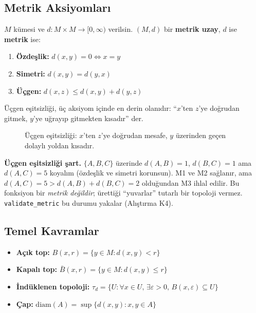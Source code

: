 \subsection{Metrik Aksiyomları}

\begin{definition}
$M$ kümesi ve $d: M \times M \to [0,\infty)$ verilsin.
$(M, d)$ bir \textbf{metrik uzay}, $d$ ise \textbf{metrik} ise:
\begin{enumerate}
  \item[(M1)] \textbf{Özdeşlik:} $d(x,y) = 0 \Leftrightarrow x = y$
  \item[(M2)] \textbf{Simetri:} $d(x,y) = d(y,x)$
  \item[(M3)] \textbf{Üçgen:} $d(x,z) \leq d(x,y) + d(y,z)$
\end{enumerate}
\end{definition}

Üçgen eşitsizliği, üç aksiyom içinde en derin olanıdır: ``$x$'ten $z$'ye doğrudan
gitmek, $y$'ye uğrayıp gitmekten kısadır'' der.

\begin{figure}[ht]
  \centering
  
  \caption{Üçgen eşitsizliği: $x$'ten $z$'ye doğrudan mesafe, $y$ üzerinden geçen
    dolaylı yoldan kısadır.}
\end{figure}

\begin{karsiornek}
\textbf{Üçgen eşitsizliği şart.} $\{A,B,C\}$ üzerinde $d(A,B)=1$, $d(B,C)=1$ ama
$d(A,C)=5$ koyalım (özdeşlik ve simetri korunsun). M1 ve M2 sağlanır, ama
$d(A,C)=5 > d(A,B)+d(B,C)=2$ olduğundan M3 ihlal edilir. Bu fonksiyon bir
\emph{metrik değildir}; ürettiği ``yuvarlar'' tutarlı bir topoloji vermez.
\texttt{validate\_metric} bu durumu yakalar (Alıştırma K4).
\end{karsiornek}

\subsection{Temel Kavramlar}

\begin{itemize}
  \item \textbf{Açık top:} $B(x, r) = \{y \in M : d(x,y) < r\}$
  \item \textbf{Kapalı top:} $\bar{B}(x, r) = \{y \in M : d(x,y) \leq r\}$
  \item \textbf{İndüklenen topoloji:} $\tau_d = \{U : \forall x \in U,\,\exists\varepsilon>0,\,B(x,\varepsilon) \subseteq U\}$
  \item \textbf{Çap:} $\mathrm{diam}(A) = \sup\{d(x,y) : x,y \in A\}$
\end{itemize}

